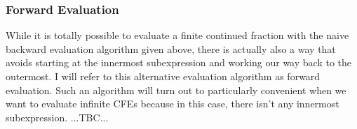 




\subsubsection{Forward Evaluation}
While it is totally possible to evaluate a finite continued fraction with the naive backward evaluation algorithm given above, there is actually also a way that avoids starting at the innermost subexpression and working our way back to the outermost. I will refer to this alternative evaluation algorithm as forward evaluation. Such an algorithm will turn out to particularly convenient when we want to evaluate infinite CFEs because in this case, there isn't any innermost subexpression. ...TBC...



